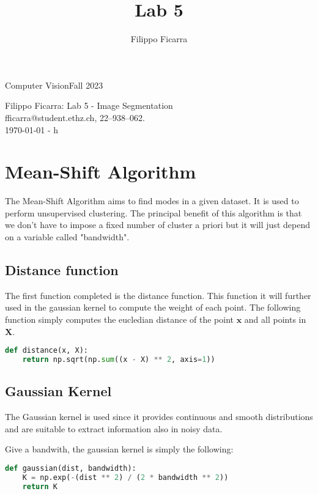 \documentclass{ETHExercise}
\title{Lab 5}
\author{Filippo Ficarra}
\newcommand{\timestamp}{\ddmmyyyydate\today \,\,- \currenttime h}
\begin{document}
{}
{\Large Computer Vision}{Fall 2023}
\begin{center}
    {\Huge Filippo Ficarra: Lab 5 - Image Segmentation}\\
      \quad\newline
      fficarra@student.ethz.ch, 22--938--062.\\
      \quad\newline
      \timestamp
      \end{center}

\section{Mean-Shift Algorithm}

The Mean-Shift Algorithm aims to find modes in a given dataset. It is used 
to perform unsupervised clustering. The principal benefit of 
this algorithm is that we don't have to impose a fixed number of cluster a priori
but it will just depend on a variable called "bandwidth".


\subsection{Distance function}

The first function completed is the distance function. This function it will 
further used in the gaussian kernel to compute the weight of each point.
The following function simply computes the eucledian distance of the point $\bm{x}$ and all
points in $\bm{X}$.

\begin{lstlisting}[language=Python, caption=Distance function]
  def distance(x, X):
    return np.sqrt(np.sum((x - X) ** 2, axis=1))
\end{lstlisting}

\subsection{Gaussian Kernel}
The Gaussian kernel is used since it provides continuous and smooth distributions
and are suitable to extract information also in noisy data.

Give a bandwith, the gaussian kernel is simply the following:
\begin{lstlisting}[language=Python, caption=Gaussian Kernel]
  def gaussian(dist, bandwidth):
    K = np.exp(-(dist ** 2) / (2 * bandwidth ** 2))
    return K
\end{lstlisting}
\end{document}
